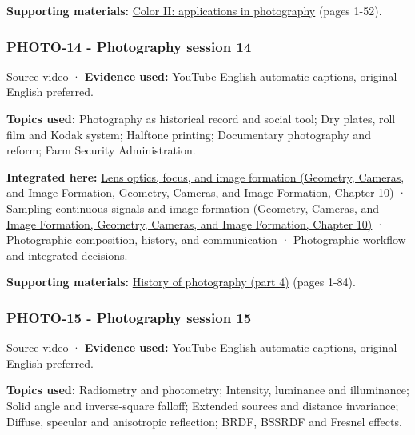 \textbf{Supporting materials:} \href{https://drive.google.com/open?id=0B6w2XfPHEcZYWllrZHZzRHlZWlk}{Color II: applications in photography} (pages 1-52).

\subsubsection{PHOTO-14 - Photography session 14}\label{04-visual-computing-ii-ch036-photo-14---photography-session-14}

\href{https://www.youtube.com/watch?v=p964fzQC11g}{Source video} · \textbf{Evidence used:} YouTube English automatic captions, original English preferred.

\textbf{Topics used:} Photography as historical record and social tool; Dry plates, roll film and Kodak system; Halftone printing; Documentary photography and reform; Farm Security Administration.

\textbf{Integrated here:} \href{../03-Geometry-Cameras-and-Image-Formation/main.pdf\#nameddest=03-visual-computing-i-ch003-lens-optics-focus-and-image-formation}{Lens optics, focus, and image formation (Geometry, Cameras, and Image Formation, Geometry, Cameras, and Image Formation, Chapter 10)} · \href{../03-Geometry-Cameras-and-Image-Formation/main.pdf\#nameddest=03-visual-computing-i-ch003-sampling-continuous-signals-and-image-formation}{Sampling continuous signals and image formation (Geometry, Cameras, and Image Formation, Geometry, Cameras, and Image Formation, Chapter 10)} · \hyperref[04-visual-computing-ii-ch034-photographic-composition-history-and-communication]{Photographic composition, history, and communication} · \hyperref[04-visual-computing-ii-ch034-photographic-workflow-and-integrated-decisions]{Photographic workflow and integrated decisions}.

\textbf{Supporting materials:} \href{https://drive.google.com/open?id=0B6w2XfPHEcZYTjRoLWhnSUFEYTQ}{History of photography (part 4)} (pages 1-84).

\subsubsection{PHOTO-15 - Photography session 15}\label{04-visual-computing-ii-ch036-photo-15---photography-session-15}

\href{https://www.youtube.com/watch?v=kO68jM_1eho}{Source video} · \textbf{Evidence used:} YouTube English automatic captions, original English preferred.

\textbf{Topics used:} Radiometry and photometry; Intensity, luminance and illuminance; Solid angle and inverse-square falloff; Extended sources and distance invariance; Diffuse, specular and anisotropic reflection; BRDF, BSSRDF and Fresnel effects.

